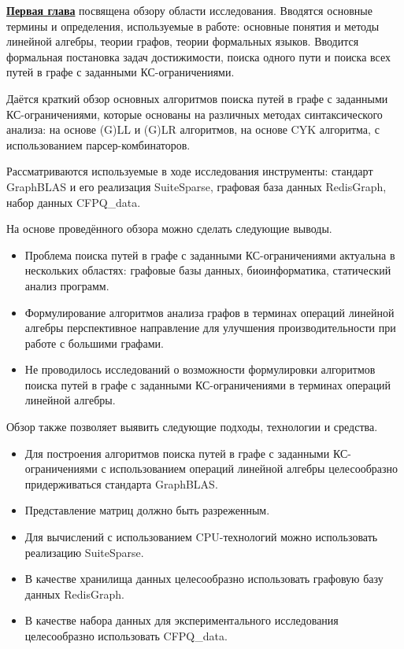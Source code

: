 \underline{\textbf{Первая глава}} посвящена обзору области исследования. Вводятся основные термины и определения, используемые в работе: основные понятия и методы линейной алгебры, теории графов, теории формальных языков. Вводится формальная постановка задач достижимости, поиска одного пути и поиска всех путей в графе с заданными КС-ограничениями.

Даётся краткий обзор основных алгоритмов поиска путей в графе с заданными КС-ограничениями, которые основаны на различных методах синтаксического анализа: на основе (G)LL и (G)LR алгоритмов, на основе CYK алгоритма, с использованием парсер-комбинаторов.

Рассматриваются используемые в ходе исследования инструменты: стандарт GraphBLAS и его реализация SuiteSparse, графовая база данных RedisGraph, набор данных CFPQ\_data.

На основе проведённого обзора можно сделать следующие выводы.
\begin{itemize}
	\item Проблема поиска путей в графе с заданными КС-ограничениями актуальна в нескольких областях: графовые базы данных, биоинформатика, статический анализ программ.
	\item Формулирование алгоритмов анализа графов в терминах операций линейной алгебры перспективное направление для улучшения производительности при работе с большими графами.
	\item Не проводилось исследований о возможности формулировки алгоритмов поиска путей в графе с заданными КС-ограничениями в терминах операций линейной алгебры.
\end{itemize}

Обзор также позволяет выявить следующие подходы, технологии и средства.
\begin{itemize}
	\item Для построения алгоритмов поиска путей в графе с заданными КС-ограничениями с использованием операций линейной алгебры целесообразно придерживаться стандарта GraphBLAS.
	\item Представление матриц должно быть разреженным.
	\item Для вычислений с использованием CPU-технологий можно использовать реализацию SuiteSparse.
	\item В качестве хранилища данных целесообразно использовать графовую базу данных RedisGraph.
	\item В качестве набора данных для экспериментального исследования целесообразно использовать CFPQ\_data.
\end{itemize}

